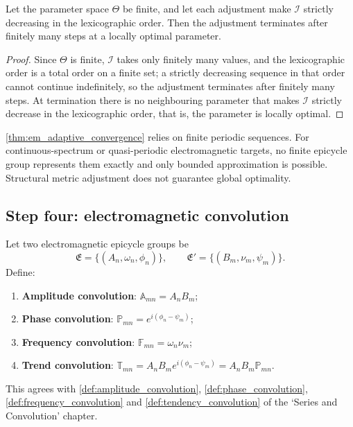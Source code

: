 \begin{proposition}\label{prop:em_structure_metric_convergence}
Let the parameter space $\Theta$ be finite, and let each adjustment make $\mathcal I$ strictly decreasing in the lexicographic order. Then the adjustment terminates after finitely many steps at a locally optimal parameter.
\end{proposition}

\begin{proof}
Since $\Theta$ is finite, $\mathcal I$ takes only finitely many values, and the lexicographic order is a total order on a finite set; a strictly decreasing sequence in that order cannot continue indefinitely, so the adjustment terminates after finitely many steps. At termination there is no neighbouring parameter that makes $\mathcal I$ strictly decrease in the lexicographic order, that is, the parameter is locally optimal.
\end{proof}

\begin{remark}\label{rem:em_adaptive_boundary}
\cref{thm:em_adaptive_convergence} relies on finite periodic sequences. For continuous-spectrum or quasi-periodic electromagnetic targets, no finite epicycle group represents them exactly and only bounded approximation is possible. Structural metric adjustment does not guarantee global optimality.
\end{remark}

\subsection{Step four: electromagnetic convolution}

\begin{definition}\label{def:em_convolution_types}
Let two electromagnetic epicycle groups be
\[
\mathfrak E=\{(A_n,\omega_n,\phi_n)\},\qquad
\mathfrak E'=\{(B_m,\nu_m,\psi_m)\}.
\]
Define:
\begin{enumerate}[label=(\roman*)]
    \item \textbf{Amplitude convolution}: $\mathbb A_{mn}=A_nB_m$;
    \item \textbf{Phase convolution}: $\mathbb P_{mn}=e^{i(\phi_n-\psi_m)}$;
    \item \textbf{Frequency convolution}: $\mathbb F_{mn}=\omega_n\nu_m$;
    \item \textbf{Trend convolution}: $\mathbb T_{mn}=A_nB_m e^{i(\phi_n-\psi_m)}=A_nB_m\mathbb P_{mn}$.
\end{enumerate}
This agrees with \cref{def:amplitude_convolution}, \cref{def:phase_convolution}, \cref{def:frequency_convolution} and \cref{def:tendency_convolution} of the `Series and Convolution' chapter.
\end{definition}


